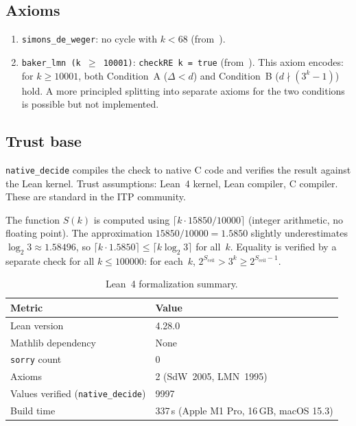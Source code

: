 \documentclass[11pt, a4paper]{amsart}
\theoremstyle{plain}
\theoremstyle{definition}
\theoremstyle{remark}
\begin{document}
\subsection{Axioms}

\begin{enumerate}
  \item \texttt{simons\_de\_weger}: no cycle with $k < 68$
    (from~\cite{SimonsDeWeger2005}).
  \item \texttt{baker\_lmn (k $\geq$ 10001)}: \texttt{checkRE k = true}
    (from~\cite{LMN1995}).  This axiom encodes: for
    $k \geq 10001$, both Condition~A ($\Delta < d$) and
    Condition~B ($d \nmid (3^k-1)$) hold.  A more principled
    splitting into separate axioms for the two conditions is
    possible but not implemented.
\end{enumerate}

\subsection{Trust base}

\texttt{native\_decide} compiles the check to native C code
and verifies the result against the Lean kernel.
Trust assumptions: Lean~4 kernel, Lean compiler, C compiler.
These are standard in the ITP community.

The function $S(k)$ is computed using
$\lceil k \cdot 15850 / 10000 \rceil$ (integer arithmetic,
no floating point).  The approximation
$15850/10000 = 1.5850$ slightly underestimates
$\log_2 3 \approx 1.58496$, so
$\lceil k \cdot 1.5850 \rceil \leq \lceil k \log_2 3 \rceil$
for all~$k$.  Equality is verified by a separate check
for all $k \leq 100000$: for each~$k$,
$2^{S_{\text{ceil}}} > 3^k \geq 2^{S_{\text{ceil}}-1}$.

\begin{table}[ht]
\centering
\caption{Lean~4 formalization summary.}
\label{tab:lean}
\begin{tabular}{ll}
\toprule
Metric & Value \\
\midrule
Lean version & 4.28.0 \\
Mathlib dependency & None \\
\texttt{sorry} count & 0 \\
Axioms & 2 (SdW~2005, LMN~1995) \\
Values verified (\texttt{native\_decide}) & 9997 \\
Build time & 337\,s (Apple M1 Pro, 16\,GB, macOS 15.3) \\
\bottomrule
\end{tabular}
\end{table}
\end{document}
